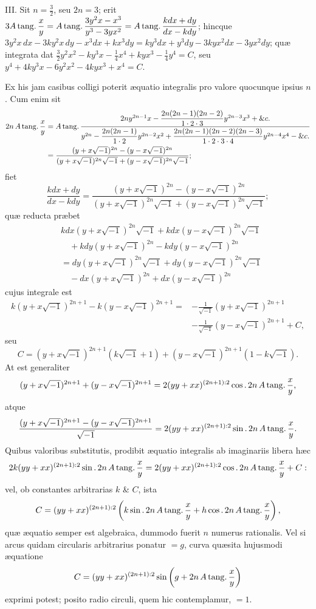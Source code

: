 III. Sit $n=\frac32$, seu $2n=3$; erit $3A\operatorname{tang\textnormal{.}}\dfrac{x}{y}=A\operatorname{tang\textnormal{.}}\dfrac{3y^2x-x^3}{y^3-3yx^2}=A\operatorname{tang\textnormal{.}}\dfrac{kdx+dy}{dx-kdy}$; hincque $3y^2x\,dx-3ky^2x\,dy-x^3dx+kx^3dy=ky^3dx+y^3dy-3kyx^2dx-3yx^2dy$; quæ integrata dat $\frac32y^2x^2-ky^3x-\frac14x^4+kyx^3-\frac14y^4=C$, seu $y^4+4ky^3x-6y^2x^2-4kyx^3+x^4=C$.

Ex his jam casibus colligi poterit æquatio integralis pro valore quocunque ipsius $n$. Cum enim sit
\[
\begin{aligned}
2n\,A\operatorname{tang\textnormal{.}}\frac{x}{y}
&=A\operatorname{tang\textnormal{.}}\frac{2ny^{2n-1}x-\dfrac{2n(2n-1)(2n-2)}{1\cdot2\cdot3}y^{2n-3}x^3+\&c.}{y^{2n}-\dfrac{2n(2n-1)}{1\cdot2}y^{2n-2}x^2+\dfrac{2n(2n-1)(2n-2)(2n-3)}{1\cdot2\cdot3\cdot4}y^{2n-4}x^4-\&c.}\\
&=\frac{(y+x\sqrt{-1})^{2n}-(y-x\sqrt{-1})^{2n}}{(y+x\sqrt{-1})^{2n}\sqrt{-1}+(y-x\sqrt{-1})^{2n}\sqrt{-1}};
\end{aligned}
\]
fiet
\[
\frac{kdx+dy}{dx-kdy}=\frac{(y+x\sqrt{-1})^{2n}-(y-x\sqrt{-1})^{2n}}{(y+x\sqrt{-1})^{2n}\sqrt{-1}+(y-x\sqrt{-1})^{2n}\sqrt{-1}};
\]
quæ reducta præbet
\[
\begin{aligned}
&kdx(y+x\sqrt{-1})^{2n}\sqrt{-1}+kdx(y-x\sqrt{-1})^{2n}\sqrt{-1}\\
&\quad+kdy(y+x\sqrt{-1})^{2n}-kdy(y-x\sqrt{-1})^{2n}\\
&=dy(y+x\sqrt{-1})^{2n}\sqrt{-1}+dy(y-x\sqrt{-1})^{2n}\sqrt{-1}\\
&\quad-dx(y+x\sqrt{-1})^{2n}+dx(y-x\sqrt{-1})^{2n}
\end{aligned}
\]
cujus integrale est
\[
\begin{aligned}
k(y+x\sqrt{-1})^{2n+1}-k(y-x\sqrt{-1})^{2n+1}
={}&-\frac1{\sqrt{-1}}(y+x\sqrt{-1})^{2n+1}\\
&-\frac1{\sqrt{-1}}(y-x\sqrt{-1})^{2n+1}+C,
\end{aligned}
\]
seu
\[
C=(y+x\sqrt{-1})^{2n+1}(k\sqrt{-1}+1)+(y-x\sqrt{-1})^{2n+1}(1-k\sqrt{-1}).
\]
At est generaliter
\[
(y+x\sqrt{-1})^{2n+1}+(y-x\sqrt{-1})^{2n+1}=2(yy+xx)^{(2n+1):2}\cos.\,2n\,A\operatorname{tang\textnormal{.}}\frac{x}{y},
\]
atque
\[
\frac{(y+x\sqrt{-1})^{2n+1}-(y-x\sqrt{-1})^{2n+1}}{\sqrt{-1}}=2(yy+xx)^{(2n+1):2}\sin.\,2n\,A\operatorname{tang\textnormal{.}}\frac{x}{y}.
\]
Quibus valoribus substitutis, prodibit æquatio integralis ab imaginariis libera hæc
\[
2k(yy+xx)^{(2n+1):2}\sin.\,2n\,A\operatorname{tang\textnormal{.}}\frac{x}{y}=2(yy+xx)^{(2n+1):2}\cos.\,2n\,A\operatorname{tang\textnormal{.}}\frac{x}{y}+C:
\]
vel, ob constantes arbitrarias $k$ \& $C$, ista
\[
C=(yy+xx)^{(2n+1):2}\left(k\sin.\,2n\,A\operatorname{tang\textnormal{.}}\frac{x}{y}+h\cos.\,2n\,A\operatorname{tang\textnormal{.}}\frac{x}{y}\right),
\]
quæ æquatio semper est algebraica, dummodo fuerit $n$ numerus rationalis. Vel si arcus quidam circularis arbitrarius ponatur $=g$, curva quæsita hujusmodi æquatione
\[
C=(yy+xx)^{(2n+1):2}\sin\left(g+2n\,A\operatorname{tang\textnormal{.}}\frac{x}{y}\right)
\]
exprimi potest; posito radio circuli, quem hic contemplamur, $=1$.

